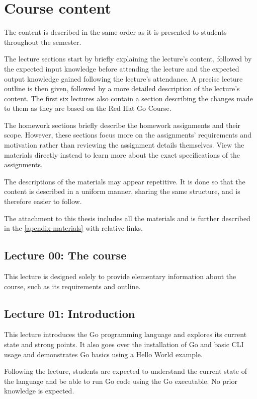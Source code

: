 \documentclass[
  digital,
  color,
  oneside,
  nosansbold,
  nocolorbold,
  nolof,
  nolot,
]{fithesis4}
\begin{document}
\chapter{Course content}\label{chapter-content}

The content is described in the same order as it is presented to students throughout the semester.

The lecture sections start by briefly explaining the lecture's content, followed by the expected input knowledge before attending the lecture and the expected output knowledge gained following the lecture's attendance. A precise lecture outline is then given, followed by a more detailed description of the lecture's content. The first six lectures also contain a section describing the changes made to them as they are based on the Red Hat Go Course.

The homework sections briefly describe the homework assignments and their scope. However, these sections focus more on the assignments' requirements and motivation rather than reviewing the assignment details themselves. View the materials directly instead to learn more about the exact specifications of the assignments.

The descriptions of the materials may appear repetitive. It is done so that the content is described in a uniform manner, sharing the same structure, and is therefore easier to follow.

The attachment to this thesis includes all the materials and is further described in the \cref{apendix-materials} with relative links.

\section{Lecture 00: The course}

This lecture is designed solely to provide elementary information about the course, such as its requirements and outline.

\section{Lecture 01: Introduction}

This lecture introduces the Go programming language and explores its current state and strong points. It also goes over the installation of Go and basic CLI usage and demonstrates Go basics using a Hello World example.

Following the lecture, students are expected to understand the current state of the language and be able to run Go code using the Go executable. No prior knowledge is expected.
\end{document}
